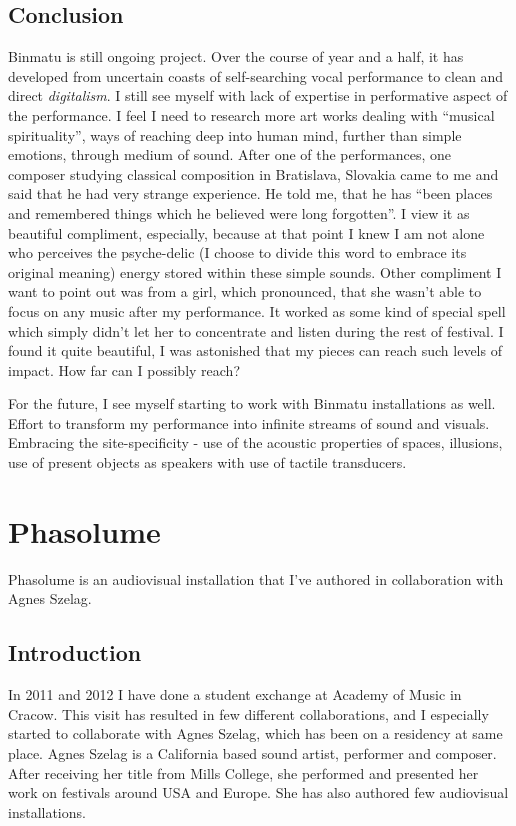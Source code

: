 \documentclass[12pt,a4paper,oneside]{report}
\begin{document}
\subsection{Conclusion} Binmatu is still ongoing project. Over the course of year and a half, it has developed from uncertain coasts of self-searching vocal performance to clean and direct \emph{digitalism}. I still see myself with lack of expertise in performative aspect of the performance. I feel I need to research more art works dealing with ``musical spirituality'', ways of reaching deep into human mind, further than simple emotions, through medium of sound. After one of the performances, one composer studying classical composition in Bratislava, Slovakia came to me and said that he had very strange experience. He told me, that he has ``been places and remembered things which he believed were long forgotten''. I view it as beautiful compliment, especially, because at that point I knew I am not alone who perceives the psyche-delic (I choose to divide this word to embrace its original meaning) energy stored within these simple sounds. Other compliment I want to point out was from a girl, which pronounced, that she wasn't able to focus on any music after my performance. It worked as some kind of special spell which simply didn't let her to concentrate and listen during the rest of festival. I found it quite beautiful, I was astonished that my pieces can reach such levels of impact. How far can I possibly reach?

For the future, I see myself starting to work with Binmatu installations as well. Effort to transform my performance into infinite streams of sound and visuals. Embracing the site-specificity - use of the acoustic properties of spaces, illusions, use of present objects as speakers with use of tactile transducers.

\clearpage
\section{Phasolume} Phasolume is an audiovisual installation that I've authored in collaboration with Agnes Szelag.

\subsection{Introduction} In 2011 and 2012 I have done a student exchange at Academy of Music in Cracow. This visit has resulted in few different collaborations, and I especially started to collaborate with Agnes Szelag, which has been on a residency at same place. Agnes Szelag is a California based sound artist, performer and composer. After receiving her title from Mills College, she performed and presented her work on festivals around USA and Europe. She has also authored few audiovisual installations. 
\end{document}
